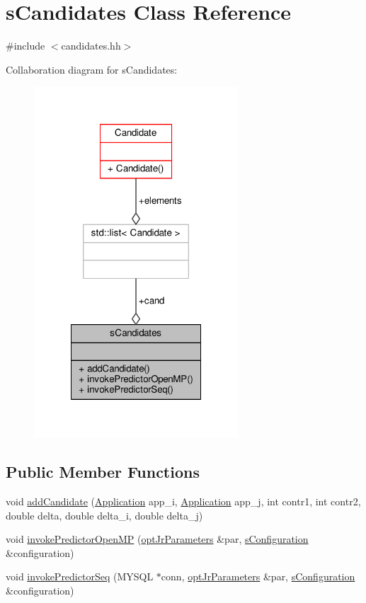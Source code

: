 \hypertarget{classsCandidates}{\section{s\-Candidates Class Reference}
\label{classsCandidates}
}


{\ttfamily \#include $<$candidates.\-hh$>$}



Collaboration diagram for s\-Candidates\-:
\nopagebreak
\begin{figure}[H]
\begin{center}
\leavevmode
\includegraphics[width=216pt]{classsCandidates__coll__graph}
\end{center}
\end{figure}
\subsection*{Public Member Functions}
\begin{DoxyCompactItemize}
\item 
void \hyperlink{classsCandidates_ae71fd23dda6a91a774ae6e61147bcf59}{add\-Candidate} (\hyperlink{classApplication}{Application} app\-\_\-i, \hyperlink{classApplication}{Application} app\-\_\-j, int contr1, int contr2, double delta, double delta\-\_\-i, double delta\-\_\-j)
\item 
void \hyperlink{classsCandidates_ac5ff86e5acf736ef57a3eb25c0d724ab}{invoke\-Predictor\-Open\-M\-P} (\hyperlink{classoptJrParameters}{opt\-Jr\-Parameters} \&par, \hyperlink{readConfigurationFile_8hh_ab8f35b1da3261263c5e9c0e7c8921f5c}{s\-Configuration} \&configuration)
\item 
void \hyperlink{classsCandidates_a79ab5675418a37532bf447cfa8baf975}{invoke\-Predictor\-Seq} (M\-Y\-S\-Q\-L $\ast$conn, \hyperlink{classoptJrParameters}{opt\-Jr\-Parameters} \&par, \hyperlink{readConfigurationFile_8hh_ab8f35b1da3261263c5e9c0e7c8921f5c}{s\-Configuration} \&configuration)
\end{DoxyCompactItemize}
